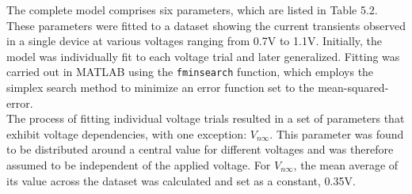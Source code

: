 

\noindent The complete model comprises six parameters, which are listed in Table 5.2. These parameters were fitted to a dataset showing the current transients observed in a single device at various voltages ranging from 0.7V to 1.1V. Initially, the model was individually fit to each voltage trial and later generalized. Fitting was carried out in MATLAB using the \texttt{fminsearch} function, which employs the simplex search method \cite{lagarias1998convergence} to minimize an error function set to the mean-squared-error.\\


\noindent The process of fitting individual voltage trials resulted in a set of parameters that exhibit voltage dependencies, with one exception: $V_{n\infty}$. This parameter was found to be distributed around a central value for different voltages and was therefore assumed to be independent of the applied voltage. For $V_{n\infty}$, the mean average of its value across the dataset was calculated and set as a constant, 0.35V.\\

